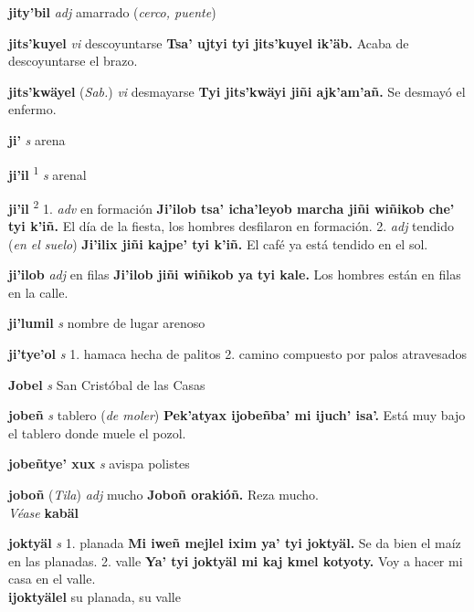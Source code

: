 \documentclass[10pt]{scrbook}
\newcommand{\entry}[1]{\textbf{#1}}
\newcommand{\onedefinition}[1]{#1.}
\newcommand{\defsuperscript}[1]{\textsuperscript{#1}}
\newcommand{\partofspeech}[1]{\textit{#1}}
\newcommand{\spanishtranslation}[1]{#1}
\newcommand{\clarification}[1]{(\textit{#1})}
\newcommand{\cholexample}[1]{\textbf{#1}}
\newcommand{\exampletranslation}[1]{#1}
\newcommand{\alsosee}[1]{\\\textit{Véase} \textbf{#1}}
\newcommand{\relevantdialect}[1]{(\textit{#1})}
\newcommand{\secondaryentry}[1]{\\\textbf{#1}}
\newcommand{\secondtranslation}[1]{#1}
\begin{document}
\begin{multicols}{2}
\entry{jity'bil}
\partofspeech{adj}
\spanishtranslation{amarrado}
\clarification{cerco, puente}

\entry{jits'kuyel}
\partofspeech{vi}
\spanishtranslation{descoyuntarse}
\cholexample{Tsa' ujtyi tyi jits'kuyel ik'äb.}
\exampletranslation{Acaba de descoyuntarse el brazo.}

\entry{jits'kwäyel}
\relevantdialect{Sab.}
\partofspeech{vi}
\spanishtranslation{desmayarse}
\cholexample{Tyi jits'kwäyi jiñi ajk'am'añ.}
\exampletranslation{Se desmayó el enfermo.}

\entry{ji'}
\partofspeech{s}
\spanishtranslation{arena}

\entry{ji'il}
\defsuperscript{1}
\partofspeech{s}
\spanishtranslation{arenal}

\entry{ji'il}
\defsuperscript{2}
\onedefinition{1}
\partofspeech{adv}
\spanishtranslation{en formación}
\cholexample{Ji'ilob tsa' icha'leyob marcha jiñi wiñikob che' tyi k'iñ.}
\exampletranslation{El día de la fiesta, los hombres desfilaron en formación.}
\onedefinition{2}
\partofspeech{adj}
\spanishtranslation{tendido}
\clarification{en el suelo}
\cholexample{Ji'ilix jiñi kajpe' tyi k'iñ.}
\exampletranslation{El café ya está tendido en el sol.}

\entry{ji'ilob}
\partofspeech{adj}
\spanishtranslation{en filas}
\cholexample{Ji'ilob jiñi wiñikob ya tyi kale.}
\exampletranslation{Los hombres están en filas en la calle.}

\entry{ji'lumil}
\partofspeech{s}
\spanishtranslation{nombre de lugar arenoso}

\entry{ji'tye'ol}
\partofspeech{s}
\onedefinition{1}
\spanishtranslation{hamaca hecha de palitos}
\onedefinition{2}
\spanishtranslation{camino compuesto por palos atravesados}

\entry{Jobel}
\partofspeech{s}
\spanishtranslation{San Cristóbal de las Casas}

\entry{jobeñ}
\partofspeech{s}
\spanishtranslation{tablero}
\clarification{de moler}
\cholexample{Pek'atyax ijobeñba' mi ijuch' isa'.}
\exampletranslation{Está muy bajo el tablero donde muele el pozol.}

\entry{jobeñtye' xux}
\partofspeech{s}
\spanishtranslation{avispa polistes}

\entry{joboñ}
\relevantdialect{Tila}
\partofspeech{adj}
\spanishtranslation{mucho}
\cholexample{Joboñ orakióñ.}
\exampletranslation{Reza mucho.}
\alsosee{kabäl}

\entry{joktyäl}
\partofspeech{s}
\onedefinition{1}
\spanishtranslation{planada}
\cholexample{Mi iweñ mejlel ixim ya' tyi joktyäl.}
\exampletranslation{Se da bien el maíz en las planadas.}
\onedefinition{2}
\spanishtranslation{valle}
\cholexample{Ya' tyi joktyäl mi kaj kmel kotyoty.}
\exampletranslation{Voy a hacer mi casa en el valle.}
\secondaryentry{ijoktyälel}
\secondtranslation{su planada, su valle}


\end{multicols}
\end{document}
